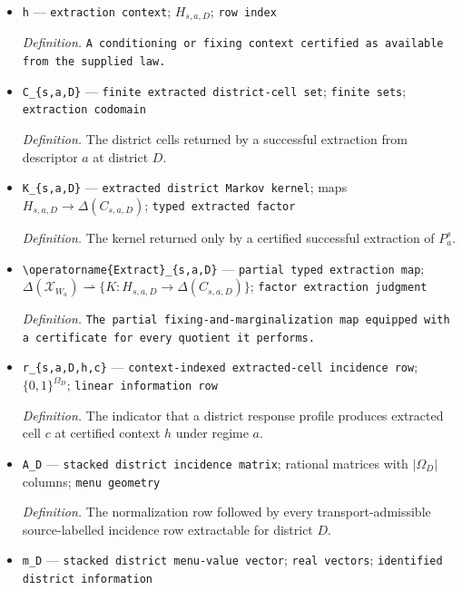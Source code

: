 \documentclass{article}
\begin{document}
\begin{itemize}
  \item \texttt{h} --- \texttt{extraction context}; \(H_{s,a,D}\); \texttt{row index}
  \par\smallskip\noindent\emph{Definition.} \texttt{A conditioning or fixing context certified as available from the supplied law.}
  \item \texttt{C\_\allowbreak{}\{s,\allowbreak{}a,\allowbreak{}D\}\allowbreak{}} --- \texttt{finite extracted district-\allowbreak{}cell set}; \texttt{finite sets}; \texttt{extraction codomain}
  \par\smallskip\noindent\emph{Definition.} The district cells returned by a successful extraction from descriptor \(a\) at district \(D\).
  \item \texttt{K\_\allowbreak{}\{s,\allowbreak{}a,\allowbreak{}D\}\allowbreak{}} --- \texttt{extracted district Markov kernel}; maps \(H_{s,a,D}\to\Delta(C_{s,a,D})\); \texttt{typed extracted factor}
  \par\smallskip\noindent\emph{Definition.} The kernel returned only by a certified successful extraction of \(P_a^s\).
  \item \texttt{\textbackslash{}\allowbreak{}operatorname\{Extract\}\allowbreak{}\_\allowbreak{}\{s,\allowbreak{}a,\allowbreak{}D\}\allowbreak{}} --- \texttt{partial typed extraction map}; \(\Delta(\mathcal X_{W_a})\rightharpoonup\{K:H_{s,a,D}\to\Delta(C_{s,a,D})\}\); \texttt{factor extraction judgment}
  \par\smallskip\noindent\emph{Definition.} \texttt{The partial fixing-\allowbreak{}and-\allowbreak{}marginalization map equipped with a certificate for every quotient it performs.}
  \item \texttt{r\_\allowbreak{}\{s,\allowbreak{}a,\allowbreak{}D,\allowbreak{}h,\allowbreak{}c\}\allowbreak{}} --- \texttt{context-\allowbreak{}indexed extracted-\allowbreak{}cell incidence row}; \(\{0,1\}^{\Omega_D}\); \texttt{linear information row}
  \par\smallskip\noindent\emph{Definition.} The indicator that a district response profile produces extracted cell \(c\) at certified context \(h\) under regime \(a\).
  \item \texttt{A\_\allowbreak{}D} --- \texttt{stacked district incidence matrix}; rational matrices with \(\lvert\Omega_D\rvert\) columns; \texttt{menu geometry}
  \par\smallskip\noindent\emph{Definition.} The normalization row followed by every transport-admissible source-labelled incidence row extractable for district \(D\).
  \item \texttt{m\_\allowbreak{}D} --- \texttt{stacked district menu-\allowbreak{}value vector}; \texttt{real vectors}; \texttt{identified district information}

\end{itemize}
\end{document}
